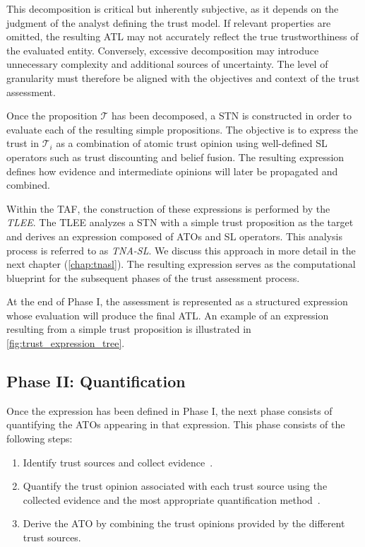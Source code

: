 This decomposition is critical but inherently subjective, as it depends on the judgment of the analyst defining the trust model. If relevant properties are omitted, the resulting \ac{ATL} may not accurately reflect the true trustworthiness of the evaluated entity. Conversely, excessive decomposition may introduce unnecessary complexity and additional sources of uncertainty. The level of granularity must therefore be aligned with the objectives and context of the trust assessment.

Once the proposition $\mathcal{T}$ has been decomposed, a \ac{STN} is constructed in order to evaluate each of the resulting simple propositions. The objective is to express the trust in $\mathcal{T}_i$ as a combination of atomic trust opinion using well-defined \ac{SL} operators such as trust discounting and belief fusion. The resulting expression defines how evidence and intermediate opinions will later be propagated and combined.

Within the \ac{TAF}, the construction of these expressions is performed by the \emph{\acf{TLEE}}. The \ac{TLEE} analyzes a \ac{STN} with a simple trust proposition as the target and derives an expression composed of \acp{ATO} and \ac{SL} operators. This analysis process is referred to as \emph{\acf{TNA-SL}}. We discuss this approach in more detail in the next chapter (\cref{chap:tnasl}). The resulting expression serves as the computational blueprint for the subsequent phases of the trust assessment process.

At the end of Phase I, the assessment is represented as a structured expression whose evaluation will produce the final \ac{ATL}. An example of an expression resulting from a simple trust proposition is illustrated in \cref{fig:trust_expression_tree}.


\subsection{Phase II:  Quantification}
\label{subsec:ch4_atomic_quantification}

Once the expression has been defined in Phase I, the next phase
consists of quantifying the \acp{ATO} appearing in that expression.
This phase consists of the following steps:

\begin{enumerate}
    \item Identify trust sources and collect evidence~\cite{Hermann2024WIP, Trkulja2023invehicle}.
    \item Quantify the trust opinion associated with each trust source using the collected evidence and the most appropriate quantification method~\cite{Hermann2024WIP}.
    \item Derive the \ac{ATO} by combining the trust opinions provided by the different trust sources.
\end{enumerate}


